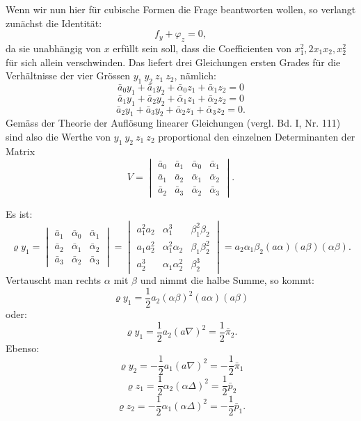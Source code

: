 \documentclass[11pt]{article}
\providecommand{\weberpage}[1]{}
\let\Delta\varDelta
\begin{document}
Wenn wir nun hier für cubische Formen die Frage beantworten wollen, so
verlangt zunächst die Identität:
\[
f_y + \varphi_z = 0,
\]
da sie unabhängig von $x$ erfüllt sein soll, dass die Coefficienten
von $x_1^2, 2x_1x_2, x_2^2$ für sich allein verschwinden. Das liefert
drei Gleichungen ersten Grades für die Verhältnisse der vier Grössen
$y_1\ y_2\ z_1\ z_2$, nämlich:
\[
\bar a_0y_1 + \bar a_1y_2 + \bar\alpha_0z_1 + \bar\alpha_1z_2 = 0
\]
\[
\bar a_1y_1 + \bar a_2y_2 + \bar\alpha_1z_1 + \bar\alpha_2z_2 = 0
\]
\[
\bar a_2y_1 + \bar a_3y_2 + \bar\alpha_2z_1 + \bar\alpha_3z_2 = 0.
\]
Gemäss der Theorie der Auflösung linearer Gleichungen (vergl. Bd. I,
Nr. 111) sind also die Werthe von $y_1\ y_2\ z_1\ z_2$ proportional den
einzelnen Determinanten der Matrix
\[
V = \begin{vmatrix} \bar a_0 & \bar a_1 & \bar\alpha_0 & \bar\alpha_1 \\ \bar a_1 & \bar a_2 & \bar\alpha_1 & \bar\alpha_2 \\ \bar a_2 & \bar a_3 & \bar\alpha_2 & \bar\alpha_3 \end{vmatrix}.
\]


\weberpage{336}

Es ist:
\[
\varrho y_1 = \begin{vmatrix} \bar a_1 & \bar\alpha_0 & \bar\alpha_1 \\ \bar a_2 & \bar\alpha_1 & \bar\alpha_2 \\ \bar a_3 & \bar\alpha_2 & \bar\alpha_3 \end{vmatrix} = \begin{vmatrix} a_1^2a_2 & \alpha_1^3 & \beta_1^2\beta_2 \\ a_1a_2^2 & \alpha_1^2\alpha_2 & \beta_1\beta_2^2 \\ a_2^3 & \alpha_1\alpha_2^2 & \beta_2^3 \end{vmatrix} = a_2\alpha_1\beta_2(a\alpha)(a\beta)(\alpha\beta).
\]
Vertauscht man rechts $\alpha$ mit $\beta$ und nimmt die halbe Summe,
so kommt:
\[
\varrho y_1 = \frac{1}{2}a_2(\alpha\beta)^2(a\alpha)(a\beta)
\]
oder:
\[
\varrho y_1 = \frac{1}{2}a_2(a\nabla)^2 = \frac{1}{2}\bar\pi_2.
\]
Ebenso:
\[
\varrho y_2 = -\frac{1}{2}a_1(a\nabla)^2 = -\frac{1}{2}\bar\pi_1
\]
\[
\varrho z_1 = \frac{1}{2}\alpha_2(\alpha\Delta)^2 = \frac{1}{2}\bar p_2
\]
\[
\varrho z_2 = -\frac{1}{2}\alpha_1(\alpha\Delta)^2 = -\frac{1}{2}\bar p_1.
\]
\end{document}
